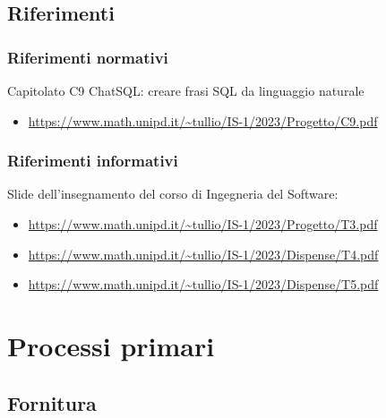 \documentclass{article}
\begin{document}
\subsection{Riferimenti}
\subsubsection{Riferimenti normativi}
Capitolato C9 ChatSQL: creare frasi SQL da linguaggio naturale
\begin{itemize}
    \item \url{https://www.math.unipd.it/~tullio/IS-1/2023/Progetto/C9.pdf}
\end{itemize}

\subsubsection{Riferimenti informativi}
Slide dell’insegnamento del corso di Ingegneria del Software:
\begin{itemize}
\item \url{https://www.math.unipd.it/~tullio/IS-1/2023/Progetto/T3.pdf}
\item \url{https://www.math.unipd.it/~tullio/IS-1/2023/Dispense/T4.pdf}
\item \url{https://www.math.unipd.it/~tullio/IS-1/2023/Dispense/T5.pdf}
\end{itemize}

\section{Processi primari}
\subsection{Fornitura}
\end{document}
